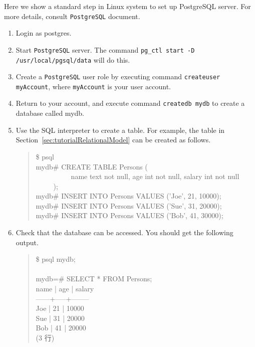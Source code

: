 \documentclass{jbook}
\newenvironment{program}{\begin{tt}\begin{quote}}{\end{quote}\end{tt}}
\newcommand{\myem}{\ \ \ \ \  }
\begin{document}
	Here we show a standard step in Linux system to set up PostgreSQL server.
	For more details, consult {\tt PostgreSQL} document.
\begin{enumerate}
\item Login as postgres.
\item Start {\tt PostgreSQL} server.
	The command {\tt pg\_ctl start -D /usr/local/pgsql/data} will do this.
\item Create a {\tt PostgreSQL} user role by executing command
{\tt createuser myAccount}, where {\tt myAccount} is your user account.
\item Return to your account, and execute command {\tt createdb mydb} to
create a database called mydb. 
\item Use the SQL interpreter to create a table.
	For example, the table in
Section~\ref{sec:tutorialRelationalModel} can be created as follows. 
\begin{program}
\$ psql\\
mydb\# CREATE TABLE Persons (\\
\myem\myem name text not null, age int not null, salary int not null
\myem );\\
mydb\# INSERT INTO Persons VALUES ('Joe', 21, 10000);\\
mydb\# INSERT INTO Persons VALUES ('Sue', 31, 20000);\\
mydb\# INSERT INTO Persons VALUES ('Bob', 41, 30000);\\
\end{program}
\item Check that the database can be accessed.
	You should get the following output.
\begin{program}
\$ psql mydb;\\
\\
mydb=\# SELECT * FROM Persons;\\
 name | age | salary \\
------+-----+--------\\
 Joe  |  21 |  10000\\
 Sue  |  31 |  20000\\
 Bob  |  41 |  20000\\
(3 行)
\end{program}
\end{enumerate}
\end{document}

